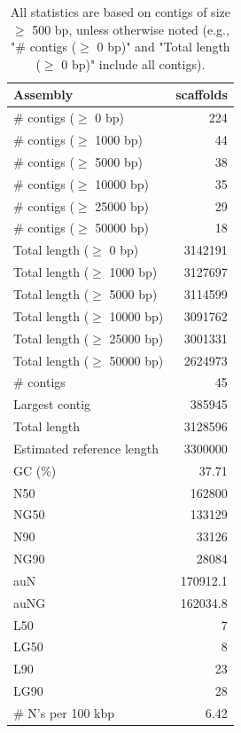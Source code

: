 \documentclass[12pt,a4paper]{article}
\begin{document}
\begin{table}[ht]
\begin{center}
\caption{All statistics are based on contigs of size $\geq$ 500 bp, unless otherwise noted (e.g., "\# contigs ($\geq$ 0 bp)" and "Total length ($\geq$ 0 bp)" include all contigs).}
\begin{tabular}{|l*{1}{|r}|}
\hline
Assembly & scaffolds \\ \hline
\# contigs ($\geq$ 0 bp) & 224 \\ \hline
\# contigs ($\geq$ 1000 bp) & 44 \\ \hline
\# contigs ($\geq$ 5000 bp) & 38 \\ \hline
\# contigs ($\geq$ 10000 bp) & 35 \\ \hline
\# contigs ($\geq$ 25000 bp) & 29 \\ \hline
\# contigs ($\geq$ 50000 bp) & 18 \\ \hline
Total length ($\geq$ 0 bp) & 3142191 \\ \hline
Total length ($\geq$ 1000 bp) & 3127697 \\ \hline
Total length ($\geq$ 5000 bp) & 3114599 \\ \hline
Total length ($\geq$ 10000 bp) & 3091762 \\ \hline
Total length ($\geq$ 25000 bp) & 3001331 \\ \hline
Total length ($\geq$ 50000 bp) & 2624973 \\ \hline
\# contigs & 45 \\ \hline
Largest contig & 385945 \\ \hline
Total length & 3128596 \\ \hline
Estimated reference length & 3300000 \\ \hline
GC (\%) & 37.71 \\ \hline
N50 & 162800 \\ \hline
NG50 & 133129 \\ \hline
N90 & 33126 \\ \hline
NG90 & 28084 \\ \hline
auN & 170912.1 \\ \hline
auNG & 162034.8 \\ \hline
L50 & 7 \\ \hline
LG50 & 8 \\ \hline
L90 & 23 \\ \hline
LG90 & 28 \\ \hline
\# N's per 100 kbp & 6.42 \\ \hline
\end{tabular}
\end{center}
\end{table}
\end{document}
